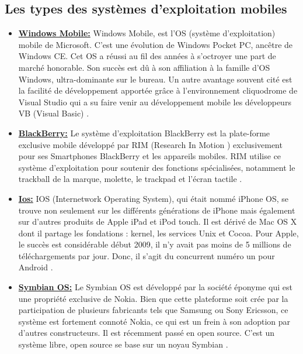 \documentclass[french,a4,12pt]{report}
\begin{document}
\begin{tcolorbox}[colframe=green!75,rightrule=0.5cm,leftrule=0.5cm,]
\subsection{Les types  des systèmes d'exploitation mobiles } 
\end{tcolorbox}
\begin{itemize}%
\item{ \underline{ \textbf{Windows Mobile:}}}
\textsf{Windows Mobile, est l'OS (système d'exploitation) mobile de Microsoft. C'est une évolution de Windows Pocket PC, ancêtre de Windows CE. Cet OS a réussi au fil des années à s'octroyer une part de marché honorable. Son succès est dû à son affiliation à la famille d'OS Windows, ultra-dominante sur le bureau. Un autre avantage souvent cité est la facilité de développement apportée grâce à l'environnement cliquodrome de Visual Studio qui a su faire venir au développement mobile les développeurs VB (Visual Basic) \cite{6}.} %
\item{ \underline{ \textbf{BlackBerry:}}}
\textsf{Le système d'exploitation BlackBerry est la plate-forme exclusive mobile développé par RIM (Research In Motion ) exclusivement pour ses Smartphones BlackBerry et les appareils mobiles. RIM utilise ce système d'exploitation pour soutenir des fonctions spécialisées, notamment le trackball de la marque, molette, le trackpad et l'écran tactile \cite{6}}.
\item{ \underline{ \textbf{Ios:}}}
\textsf{IOS (Internetwork Operating System), qui était nommé iPhone OS, se trouve non seulement sur les différents générations de iPhone mais également sur d'autres produits de Apple iPad et iPod touch. Il est dérivé de Mac OS X dont il partage les fondations : kernel, les services Unix et Cocoa. Pour Apple, le succès est considérable début 2009, il n'y avait pas moins de 5 millions de téléchargements par jour. Donc, il s'agit du concurrent numéro un pour Android \cite{6}.}
\item{ \underline{ \textbf{Symbian OS:}}}
\textsf{Le Symbian OS est développé par la société éponyme qui est une propriété exclusive de Nokia. Bien que cette plateforme soit crée par la participation de plusieurs fabricants tels que Samsung ou Sony Ericsson, ce système est fortement connoté Nokia, ce qui est un frein à son adoption par d'autres constructeurs. Il est récemment passé en open source. C'est un système libre, open source se base sur un noyau Symbian \cite{6}.}

\end{itemize}
\end{document}
